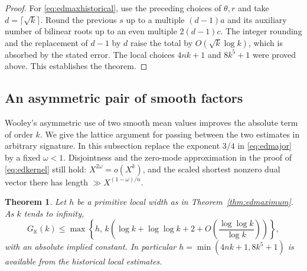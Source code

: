 \documentclass[11pt,letterpaper]{article}
\newtheorem{theorem}{Theorem}[section]
\theoremstyle{definition}
\numberwithin{equation}{section}
\begin{document}
\begin{proof}
For \eqref{eq:edmaxhistorical}, use the preceding choices of
$\theta,r$ and take $d=\lceil\sqrt{k}\rceil$.
Round the previous $s$ up to a multiple $(d-1)a$ and its auxiliary
number of bilinear roots up to an even multiple $2(d-1)c$.
The integer rounding and the replacement of $d-1$ by $d$ raise the
total by $O(\sqrt{k}\log k)$, which is absorbed by the stated error.
The local choices $4nk+1$ and $8k^5+1$ were proved above. This
establishes the theorem.
\end{proof}

\subsection{An asymmetric pair of smooth factors}

Wooley's asymmetric use of two smooth mean values
\cite[Sections~3--4]{edwooleysws} improves the absolute term of order
$k$. We give the lattice argument for passing between the two
estimates in arbitrary signature. In this subsection replace the
exponent $3/4$ in \eqref{eq:edmajor} by a fixed $\omega<1$.
Disjointness and the zero-mode approximation in the proof of
\eqref{eq:edkernel} still hold: $X^{2\omega}=o(X^k)$, and the
scaled shortest nonzero dual vector there has length
$\gg X^{(1-\omega)/n}$.

\begin{theorem}\label{thm:edasymmetric}
Let $h$ be a primitive local width as in Theorem~\ref{thm:edmaximum}.
As $k$ tends to infinity,
\begin{equation}\label{eq:edasymptotic}
  G_{\mathbb K}(k)\le\max\!\left\{h,\,
    k\left(\log k+\log\log k+2+
             O\!\left(\frac{\log\log k}{\log k}\right)\right)\right\},
\end{equation}
with an absolute implied constant. In particular
$h=\min(4nk+1,8k^5+1)$ is available from the historical local
estimates.
\end{theorem}
\end{document}
